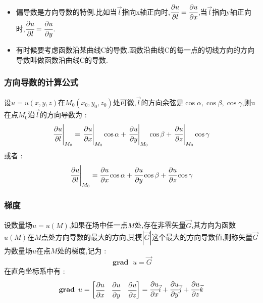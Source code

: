 \documentclass[UTF8,12pt]{ctexbook}
\newcommand{\limNormal}[1]{\lim\limits_{#1}}
\newcommand{\defFunction}[1]{f(#1)}
\newcommand{\directionDerivative}[3]{\left.\cfrac{\partial #1}{\partial #2}\right|_{#3}}
\newcommand{\partialDerivativeFrac}[2]{\cfrac{\partial #1}{\partial #2}}
\DeclareMathOperator{\gradText}{\mathbf{grad}\ }
\begin{document}
{{{{{\begin{itemize}
{              设数量场
              $$
                u = \defFunction{x,y}
              $$
              不难看出 :
              $$
                \cfrac{\Delta u}{\rho} = \cfrac{u(M) - u(M_0)}{\vec{M_0M}} = \cfrac{\defFunction{M} - \defFunction{M_0}}{\vec{M_0M}}
              $$
              正是沿着$\vec{l}$方向,函数$\defFunction{x,y}$从点$M_0$到点$M$的平均升高,即平均变化率.而极限 :
              $$
                \limNormal{M \to M_0}\cfrac{\Delta u}{\vec{\rho}} = \limNormal{M \to M_0}\cfrac{\defFunction{M} - \defFunction{M_0}}{\vec{M_0M}} (\mbox{沿着})\vec{l}
              $$
              是$u = \defFunction{x,y}$在点$M_0$沿$\vec{l}$的变化率.所以方向导数是变化率,它反映了函数$u = \defFunction{x,y}$在$\vec{l}$方向上的增减情况.当$\directionDerivative{u}{l}{M_0} > 0$,表示函数$u = \defFunction{x,y}$在点$M_0$沿方向$\vec{l}$是增加的,越大表示增加的越快,反之亦然.
              }
        \item 偏导数是方向导数的特例.比如当$\vec{l}$指向x轴正向时,$\cfrac{\partial u}{\partial l} = \cfrac{\partial u}{\partial x}$,当$\vec{l}$指向y轴正向时,$\cfrac{\partial u}{\partial l} = \cfrac{\partial u}{\partial y}$.
        \item 有时候要考虑函数沿某曲线C的导数.函数沿曲线C的每一点的切线方向的方向导数叫做函数沿曲线C的导数.
      \end{itemize}
    }%

    \subsubsection{方向导数的计算公式}{
      设$u= u(x,y,z)$在$M_0(x_0,y_0,z_0)$处可微,$\vec{l}$的方向余弦是$\cos\alpha,\cos\beta,\cos\gamma$,则u在点$M_0$沿$\vec{l}$的方向导数为 :
      $$
        \directionDerivative{u}{l}{M_0} = \directionDerivative{u}{x}{M_0}\cos\alpha + \directionDerivative{u}{y}{M_0}\cos\beta + \directionDerivative{u}{z}{M_0}\cos\gamma
      $$
      或者 :
      $$
        \directionDerivative{u}{l}{M_0} = \partialDerivativeFrac{u}{x}\cos\alpha + \partialDerivativeFrac{u}{y}\cos\beta + \partialDerivativeFrac{u}{z}\cos\gamma
      $$
    }%

    \subsubsection{梯度}{
      设数量场$u = u(M)$,如果在场中任一点$M$处,存在非零矢量$\vec{G}$,其方向为函数$u(M)$在$M$点处方向导数的最大的方向,其模$|\vec{G}|$这个最大的方向导数值,则称矢量$\vec{G}$为数量场$u$在点$M$处的梯度,记为 :
      $$
        \gradText u = \vec{G}
      $$
      在直角坐标系中有 :
      $$
        \gradText u = \begin{bmatrix}
          \partialDerivativeFrac{u}{x} & \partialDerivativeFrac{u}{y} & \partialDerivativeFrac{u}{z}
        \end{bmatrix} = \partialDerivativeFrac{u}{x}\vec{i} + \partialDerivativeFrac{u}{y}\vec{j} + \partialDerivativeFrac{u}{z}\vec{k}
      $$

}}}}}
\end{document}
